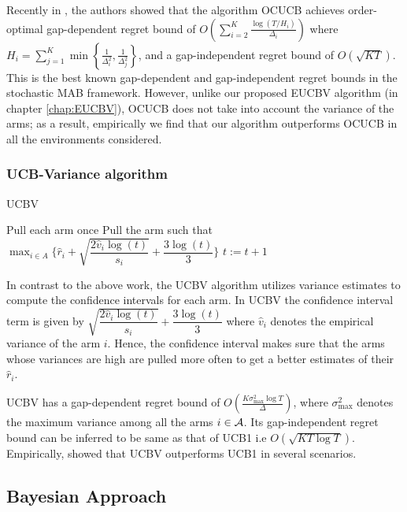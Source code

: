     Recently in \citet{lattimore2015optimally}, the authors showed that  the algorithm OCUCB achieves order-optimal gap-dependent regret bound of $O\left(\sum_{i=2}^{K}\frac{\log\left(T/H_i\right)}{\Delta_i}\right)$ where $H_i=\sum_{j=1}^{K}\min\left\lbrace \frac{1}{\Delta_i^2},\frac{1}{\Delta_j^2}\right\rbrace$, and a gap-independent regret bound of $O\left( \sqrt{KT}\right)$. This is the best known gap-dependent and gap-independent regret bounds in the stochastic MAB framework. However, unlike our proposed EUCBV algorithm (in chapter \ref{chap:EUCBV}), OCUCB does not take into account the variance of the arms; as a result, empirically  we find  that our algorithm outperforms OCUCB in all the environments considered. 

\subsubsection{UCB-Variance algorithm}

\begin{algorithm}[!th]
\caption{UCBV}
\label{alg:ucbv}
\begin{algorithmic}[1]
\State Pull each arm once
\State Pull the arm such that $\max_{i\in A}\bigg\lbrace\hat{r}_{i} + \sqrt{\dfrac{2\hat{v}_i\log (t)}{s_i}} + \dfrac{3\log (t)}{3}\bigg\rbrace$
\State $t:=t+1 $
 \EndFor
\end{algorithmic}
\end{algorithm}


    In contrast to the above work, the UCBV \citep{audibert2009exploration} algorithm utilizes variance estimates to compute the confidence intervals for each arm. In UCBV the confidence interval term is given by $\sqrt{\dfrac{2\hat{v}_i\log (t)}{s_i}} + \dfrac{3\log (t)}{3}$ where $\hat{v}_i$ denotes the empirical variance of the arm $i$. Hence, the confidence interval makes sure that the arms whose variances are high are pulled more often to get a better estimates of their $\hat{r}_i$.
    
    UCBV has a gap-dependent regret bound of $O\left(\frac{K\sigma_{\max}^{2}\log T}{\Delta}\right)$, where $\sigma_{\max}^{2}$ denotes the maximum variance among all the arms $i\in \mathcal{A}$. Its gap-independent regret bound can be inferred to be same as that of UCB1 i.e $O \left(\sqrt{KT\log T}\right)$. Empirically, \citet{audibert2009exploration} showed that UCBV outperforms UCB1 in several scenarios. 


\subsection{Bayesian Approach}

